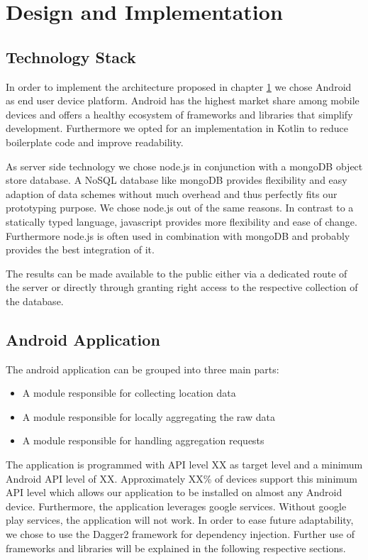 \chapter{Design and Implementation}\label{chapter:design}

\section{Technology Stack}
In order to implement the architecture proposed in chapter \ref{chapter:design} we chose Android as end user device platform. Android has the highest market share among mobile devices and offers a healthy ecosystem of frameworks and libraries that simplify development. Furthermore we opted for an implementation in Kotlin to reduce boilerplate code and improve readability.

As server side technology we chose node.js in conjunction with a mongoDB object store database. A NoSQL database like mongoDB provides flexibility and easy adaption of data schemes without much overhead and thus perfectly fits our prototyping purpose. We chose node.js out of the same reasons. In contrast to a statically typed language, javascript provides more flexibility and ease of change. Furthermore node.js is often used in combination with mongoDB and probably provides the best integration of it.

The results can be made available to the public either via a dedicated route of the server or directly through granting right access to the respective collection of the database.

\section{Android Application}
The android application can be grouped into three main parts:
\begin{itemize}
	\item A module responsible for collecting location data
	\item A module responsible for locally aggregating the raw data
	\item A module responsible for handling aggregation requests
\end{itemize}
The application is programmed with API level XX as target level and a minimum Android API level of XX. Approximately XX\% of devices support this minimum API level which allows our application to be installed on almost any Android device.
Furthermore, the application leverages google services. Without google play services, the application will not work. In order to ease future adaptability, we chose to use the Dagger2 framework for dependency injection. Further use of frameworks and libraries will be explained in the following respective sections. 

